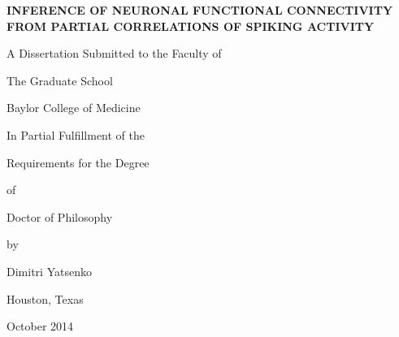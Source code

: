 \documentclass[12pt,letterpaper,titlepage,twoside,openright]{report}
\begin{document}
\begin{titlepage}
\begin{center}

\vspace*{2cm}
\textbf{\uppercase{\large Inference of neuronal functional connectivity from partial correlations of spiking activity}}

\vspace{1.5cm}
A Dissertation Submitted to the Faculty of

\medskip
The Graduate School 

Baylor College of Medicine

\vspace{1.5cm}
In Partial Fulfillment of the 

Requirements for the Degree

of 

Doctor of Philosophy

by 

\bigskip
{\large Dimitri Yatsenko}

\vfill
Houston, Texas

October 2014

\end{center}
\end{titlepage}


\end{document}
